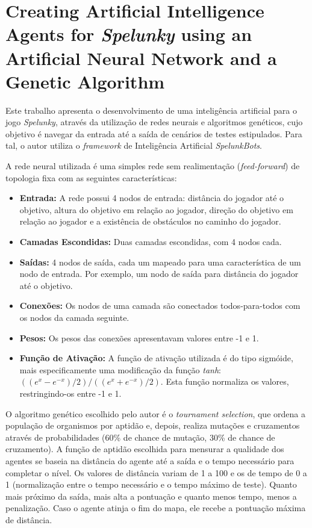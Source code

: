\section{Creating Artificial Intelligence Agents for \textit{Spelunky} using an
Artificial Neural Network and a Genetic Algorithm}
Este trabalho \cite{spelunky_ann_genetic} apresenta o desenvolvimento de uma
inteligência artificial para o jogo \textit{Spelunky}, através da utilização de
redes neurais e algoritmos genéticos, cujo objetivo é navegar da entrada até a
saída de cenários de testes estipulados. Para tal, o autor utiliza o
\textit{framework} de Inteligência Artificial \textit{SpelunkBots}.

A rede neural utilizada é uma simples rede sem realimentação
(\textit{feed-forward}) de topologia fixa com as seguintes características:

\begin{itemize}
	\item \textbf{Entrada:} A rede possui 4 nodos de entrada: distância do
		jogador até o objetivo, altura do objetivo em relação ao jogador,
		direção do objetivo em relação ao jogador e a existência de obstáculos
		no caminho do jogador.
	
	\item \textbf{Camadas Escondidas:} Duas camadas escondidas, com 4 nodos
		cada.

	\item \textbf{Saídas:} 4 nodos de saída, cada um mapeado para uma
		característica de um nodo de entrada. Por exemplo, um nodo de saída para
		distância do jogador até o objetivo.

	\item \textbf{Conexões:} Os nodos de uma camada são conectados
		todos-para-todos com os nodos da camada seguinte.

	\item \textbf{Pesos:} Os pesos das conexões apresentavam valores entre -1 e
		1.

	\item \textbf{Função de Ativação:} A função de ativação utilizada é do tipo
		sigmóide, mais especificamente uma modificação da função \textit{tanh}:
		$((e^{x} - e^{-x})/2) / ((e^{x} + e^{-x})/2)$. Esta função normaliza os
		valores, restringindo-os entre -1 e 1.
\end{itemize}

O algoritmo genético escolhido pelo autor é o \textit{tournament selection}, que
ordena a população de organismos por aptidão e, depois, realiza mutações e
cruzamentos através de probabilidades (60\% de chance de mutação, 30\% de chance
de cruzamento). A função de aptidão escolhida para mensurar a qualidade dos
agentes se baseia na distância do agente até a saída e o tempo necessário para
completar o nível. Os valores de distância variam de 1 a 100 e os de tempo de 0
a 1 (normalização entre o tempo necessário e o tempo máximo de teste). Quanto
mais próximo da saída, mais alta a pontuação e quanto menos tempo, menos a
penalização. Caso o agente atinja o fim do mapa, ele recebe a pontuação máxima
de distância.

